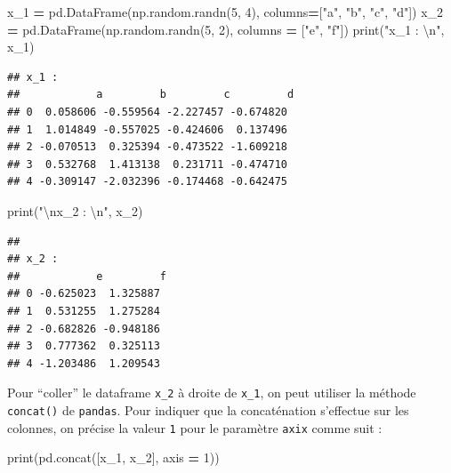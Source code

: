 \documentclass[12pt,]{book}
\newenvironment{Shaded}{\begin{snugshade}}{\end{snugshade}}
\newcommand{\DecValTok}[1]{\textcolor[rgb]{0.00,0.00,0.81}{#1}}
\newcommand{\CharTok}[1]{\textcolor[rgb]{0.31,0.60,0.02}{#1}}
\newcommand{\StringTok}[1]{\textcolor[rgb]{0.31,0.60,0.02}{#1}}
\newcommand{\OperatorTok}[1]{\textcolor[rgb]{0.81,0.36,0.00}{\textbf{#1}}}
\newcommand{\BuiltInTok}[1]{#1}
\newcommand{\NormalTok}[1]{#1}
\numberwithin{equation}{section}
\numberwithin{countremarque}{section}
\begin{document}
\begin{Shaded}
\begin{Highlighting}[]
\NormalTok{x_1 }\OperatorTok{=}\NormalTok{ pd.DataFrame(np.random.randn(}\DecValTok{5}\NormalTok{, }\DecValTok{4}\NormalTok{),}
\NormalTok{                   columns}\OperatorTok{=}\NormalTok{[}\StringTok{"a"}\NormalTok{, }\StringTok{"b"}\NormalTok{, }\StringTok{"c"}\NormalTok{, }\StringTok{"d"}\NormalTok{])}
\NormalTok{x_2 }\OperatorTok{=}\NormalTok{ pd.DataFrame(np.random.randn(}\DecValTok{5}\NormalTok{, }\DecValTok{2}\NormalTok{),}
\NormalTok{                   columns }\OperatorTok{=}\NormalTok{ [}\StringTok{"e"}\NormalTok{, }\StringTok{"f"}\NormalTok{])}
\BuiltInTok{print}\NormalTok{(}\StringTok{"x_1 : }\CharTok{\textbackslash{}n}\StringTok{"}\NormalTok{, x_1)}
\end{Highlighting}
\end{Shaded}

\begin{lstlisting}
## x_1 : 
##            a         b         c         d
## 0  0.058606 -0.559564 -2.227457 -0.674820
## 1  1.014849 -0.557025 -0.424606  0.137496
## 2 -0.070513  0.325394 -0.473522 -1.609218
## 3  0.532768  1.413138  0.231711 -0.474710
## 4 -0.309147 -2.032396 -0.174468 -0.642475
\end{lstlisting}

\begin{Shaded}
\begin{Highlighting}[]
\BuiltInTok{print}\NormalTok{(}\StringTok{"}\CharTok{\textbackslash{}n}\StringTok{x_2 : }\CharTok{\textbackslash{}n}\StringTok{"}\NormalTok{, x_2)}
\end{Highlighting}
\end{Shaded}

\begin{lstlisting}
## 
## x_2 : 
##            e         f
## 0 -0.625023  1.325887
## 1  0.531255  1.275284
## 2 -0.682826 -0.948186
## 3  0.777362  0.325113
## 4 -1.203486  1.209543
\end{lstlisting}

Pour ``coller'' le dataframe \texttt{x\_2} à droite de \texttt{x\_1}, on
peut utiliser la méthode \texttt{concat()} de \texttt{pandas}. Pour
indiquer que la concaténation s'effectue sur les colonnes, on précise la
valeur \texttt{1} pour le paramètre \texttt{axix} comme suit :

\begin{Shaded}
\begin{Highlighting}[]
\BuiltInTok{print}\NormalTok{(pd.concat([x_1, x_2], axis }\OperatorTok{=} \DecValTok{1}\NormalTok{))}
\end{Highlighting}
\end{Shaded}
\end{document}
